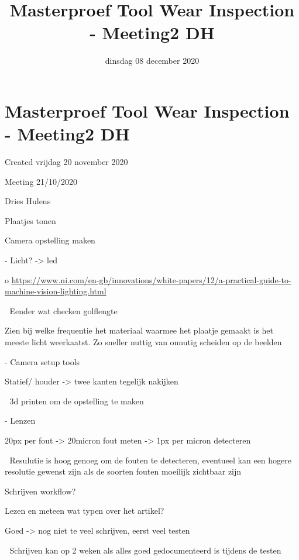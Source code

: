 \documentclass{scrartcl}
\title{Masterproef Tool Wear Inspection - Meeting2 DH}
\date{dinsdag 08 december 2020}
\author{}
\begin{document}
\maketitle

		\section{Masterproef Tool Wear Inspection - Meeting2 DH}

Created vrijdag 20 november 2020



Meeting 21/10/2020

Dries Hulens



Plaatjes tonen



Camera opstelling maken 

-	Licht? -\textgreater{} led

o	\href{https://www.ni.com/en-gb/innovations/white-papers/12/a-practical-guide-to-machine-vision-lighting.html}{https://www.ni.com/en-gb/innovations/white-papers/12/a-practical-guide-to-machine-vision-lighting.html}

	Eender wat checken golflengte 

Zien bij welke frequentie het materiaal waarmee het plaatje gemaakt is het meeste licht weerkaatst.  Zo sneller nuttig van onnutig scheiden op de beelden



-	Camera setup tools

Statief/ houder -\textgreater{} twee kanten tegelijk nakijken

	 3d printen om de opstelling te maken 



-	Lenzen

20px per fout -\textgreater{} 20micron fout meten -\textgreater{} 1px per micron detecteren

	Resulutie is hoog genoeg om de fouten te detecteren, eventueel kan een hogere resolutie gewenst zijn als de soorten fouten moeilijk zichtbaar zijn



Schrijven workflow?

	Lezen en meteen wat typen over het artikel?
	
		Goed -\textgreater{} nog niet te veel schrijven, eerst veel testen
		
	Schrijven kan op 2 weken als alles goed gedocumenteerd is tijdens de testen
\end{document}
